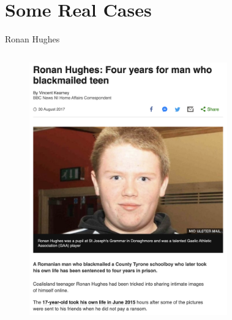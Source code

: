 \documentclass[nobackground,dvipsnames,table]{beamer}
\begin{document}
\begin{frame}{} %
    \thispagestyle{empty}
\end{frame}

\section{Some Real Cases}

\begin{frame}{Ronan Hughes}
    \begin{columns}
            \begin{figure}
                \centering
                \includegraphics[width=\textwidth]{ronan-hughes-article}
            \end{figure}
            \begin{figure}

\end{figure}
\end{columns}
\end{frame}
\end{document}

